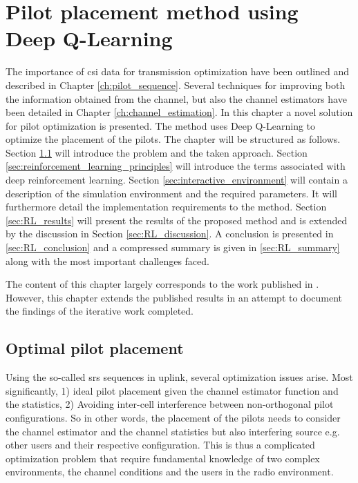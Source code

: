 \chapter{Pilot placement method using Deep Q-Learning}\label{ch:channel_q_learning}


The importance of \gls{csi} data for transmission optimization have been outlined and described in Chapter \ref{ch:pilot_sequence}. Several techniques for improving both the information obtained from the channel, but also the channel estimators have been detailed in Chapter \ref{ch:channel_estimation}. In this chapter a novel solution for pilot optimization is presented. The method uses Deep Q-Learning to optimize the placement of the pilots. The chapter will be structured as follows. Section \ref{sec:optimal_pilot_placement} will introduce the problem and the taken approach. Section \ref{sec:reinforcement_learning_principles} will introduce the terms associated with deep reinforcement learning. Section \ref{sec:interactive_environment} will contain a description of the simulation environment and the required parameters. It will furthermore detail the implementation requirements to the method.  Section \ref{sec:RL_results} will present the results of the proposed method and is extended by the discussion in Section \ref{sec:RL_discussion}. A conclusion is presented in \ref{sec:RL_conclusion} and a compressed summary is given in \ref{sec:RL_summary} along with the most important challenges faced.

The content of this chapter largely corresponds to the work published in \cite{Thrane2020PilotQ-Learning}. However, this chapter extends the published results in an attempt to document the findings of the iterative work completed. 





\section{Optimal pilot placement}\label{sec:optimal_pilot_placement}
Using the so-called \gls{srs} sequences in uplink, several optimization issues arise. Most significantly, 1) ideal pilot placement given the channel estimator function and the statistics, 2) Avoiding inter-cell interference between non-orthogonal pilot configurations. So in other words, the placement of the pilots needs to consider the channel estimator and the channel statistics but also interfering source e.g. other users and their respective configuration. This is thus a complicated optimization problem that require fundamental knowledge of two complex environments, the channel conditions and the users in the radio environment. 

